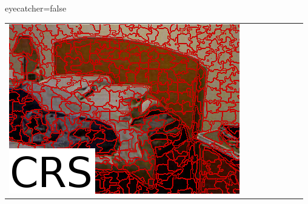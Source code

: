 \documentclass[portrait,final,a0paper,fontscale=0.28]{baposter}
\begin{document}
\begin{poster}{eyecatcher=false}
{\begin{tabularx}{\linewidth}{@{}Y@{}Y@{}Y@{}Y@{}Y@{}Y@{}Y@{}Y@{}}
{                \includegraphics{pictures/nyu-test-2-crs-excerpt}
            }
            &
            &
            &
            \resizebox{\linewidth}{!}{
}
\end{tabularx}}
\end{poster}
\end{document}
